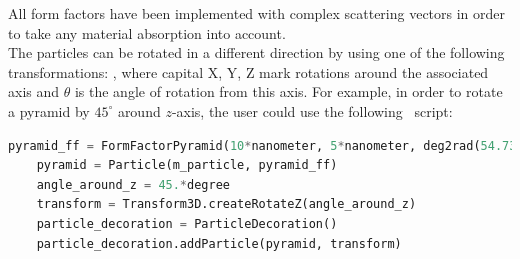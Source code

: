 All form factors have been implemented with complex scattering vectors
in order to take any material absorption into account.\\


The particles can be rotated in a different direction by using one of
the following transformations: , where capital X, Y, Z mark rotations
around the associated axis and $\theta$ is the
angle of rotation from this axis. For example, in order to rotate a pyramid by $45^{\circ}$ around
$z$-axis, the user could use the following \ script:\\

\begin{lstlisting}[language=python, style=eclipseboxed,numbers=none,nolol]
    pyramid_ff = FormFactorPyramid(10*nanometer, 5*nanometer, deg2rad(54.73 ) )
    pyramid = Particle(m_particle, pyramid_ff)
    angle_around_z = 45.*degree
    transform = Transform3D.createRotateZ(angle_around_z)
    particle_decoration = ParticleDecoration()
    particle_decoration.addParticle(pyramid, transform) 
\end{lstlisting}

\newpage





